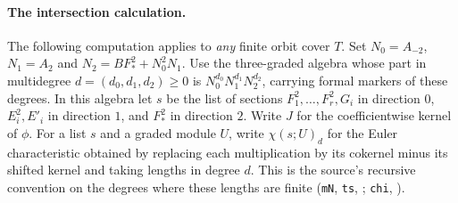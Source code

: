 \paragraph{The intersection calculation.}
The following computation applies to \emph{any} finite orbit cover $T$.
Set $N_0=A_{-2}$, $N_1=A_2$ and
$N_2=BF_*^2+N_0^2N_1$. Use the three-graded algebra whose part
in multidegree $d=(d_0,d_1,d_2)\ge0$ is
$N_0^{d_0}N_1^{d_1}N_2^{d_2}$, carrying formal markers of these
degrees. In this algebra let $s$ be the list of sections
$F_1^2,\ldots,F_r^2,G_i$ in direction $0$, $E_i^2,E'_i$ in
direction $1$, and $F_*^2$ in direction $2$. Write $J$ for the
coefficientwise kernel of $\phi$. For a list $s$ and a graded module
$U$, write $\chi(s;U)_d$ for the Euler characteristic obtained by
replacing each multiplication by its cokernel minus its shifted
kernel and taking lengths in degree $d$. This is the source's
recursive convention on the degrees where these lengths are finite
(\nolinkurl{mN}, \nolinkurl{ts}, ;
\nolinkurl{chi}, ).

